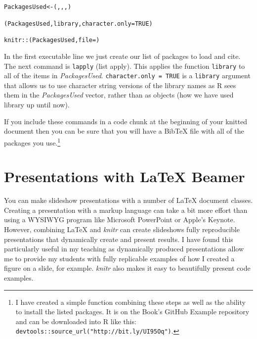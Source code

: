 \begin{knitrout}
\color{fgcolor}\begin{kframe}
\begin{alltt}
PackagesUsed <- (, , , )

(PackagesUsed, library, character.only = TRUE)

knitr::(PackagesUsed, file = )
\end{alltt}
\end{kframe}
\end{knitrout}


\noindent In the first executable line we just create our list of packages to load and cite. The next command is \texttt{lapply} (list apply). This applies the function \texttt{library} to all of the items in \emph{PackagesUsed}. \texttt{character.only = TRUE} is a \texttt{library} argument that allows us to use character string versions of the library names as R sees them in the \emph{PackagesUsed} vector, rather than as objects (how we have used library up until now).

If you include these commands in a code chunk at the beginning of your knitted document then you can be sure that you will have a BibTeX file with all of the packages you use.\footnote{I have created a simple function combining these steps as well as the ability to install the listed packages. It is on the Book's GitHub Example repository and can be downloaded into R like this: \texttt{devtools::source\_url("http://bit.ly/UI95Oq")}.}

\section{Presentations with LaTeX Beamer}

You can make slideshow presentations with a number of LaTeX document classes. Creating a presentation with a markup language can take a bit more effort than using a WYSIWYG program like Microsoft PowerPoint or Apple's Keynote. However, combining LaTeX and \emph{knitr} can create slideshows fully reproducible presentations that dynamically create and present results. I have found this particularly useful in my teaching as dynamically produced presentations allow me to provide my students with fully replicable examples of how I created a figure on a slide, for example. \emph{knitr} also makes it easy to beautifully present code examples.

